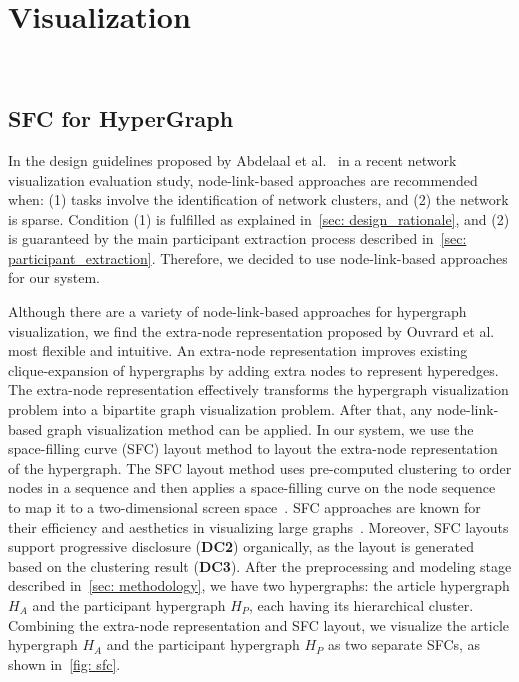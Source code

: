 \section{Visualization}~\label{sec: visualization}
\subsection{SFC for HyperGraph}

In the design guidelines proposed by Abdelaal et al.~\cite{abdelaal2022network} in a recent network visualization evaluation study, node-link-based approaches are recommended when:
(1) tasks involve the identification of network clusters, and (2) the network is sparse.
Condition (1) is fulfilled as explained in~\autoref{sec: design_rationale}, and (2) is guaranteed by the main participant extraction process described in~\autoref{sec: participant_extraction}. 
Therefore, we decided to use node-link-based approaches for our system.

Although there are a variety of node-link-based approaches for hypergraph visualization, we find the extra-node representation proposed by Ouvrard et al.~\cite{ouvrard2017hypergraph} most flexible and intuitive.
An extra-node representation improves existing clique-expansion of hypergraphs by adding extra nodes to represent hyperedges. 
The extra-node representation effectively transforms the hypergraph visualization problem into a bipartite graph visualization problem.
After that, any node-link-based graph visualization method can be applied.
In our system, we use the space-filling curve (SFC) layout method to layout the extra-node representation of the hypergraph.
The SFC layout method uses pre-computed clustering to order nodes in a sequence and then applies a space-filling curve on the node sequence to map it to a two-dimensional screen space~\cite{muelder2008sfc}.
SFC approaches are known for their efficiency and aesthetics in visualizing large graphs~\cite{ma2013largegraph}.
Moreover, SFC layouts support progressive disclosure (\textbf{DC2}) organically, as the layout is generated based on the clustering result (\textbf{DC3}).
After the preprocessing and modeling stage described in~\autoref{sec: methodology}, we have two hypergraphs: the article hypergraph $H_A$ and the participant hypergraph $H_P$, each having its hierarchical cluster.
Combining the extra-node representation and SFC layout, we visualize the article hypergraph $H_A$ and the participant hypergraph $H_P$ as two separate SFCs, as shown in~\autoref{fig: sfc}.

